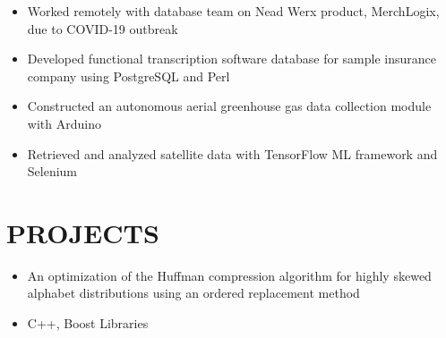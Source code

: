 \documentclass[11pt,letterpaper]{article}
\begin{document}
  {\fontsize{12}{12}}
  
  \begin{itemize}
    \item{Worked remotely with database team on Nead Werx product, MerchLogix, due to COVID-19 outbreak}
    
    \item{Developed functional transcription software database for sample insurance company using PostgreSQL and Perl}
  \end{itemize}

  {\fontsize{12}{12}}

  \begin{itemize}
    \item{Constructed an autonomous aerial greenhouse gas data collection module with Arduino}
    
    \item{Retrieved and analyzed satellite data with TensorFlow ML framework and Selenium}
  \end{itemize}

  \bigskip

  
  \section*{PROJECTS}

  \ifhuffskew
    {\fontsize{12}{12}}

    \begin{itemize}
      \item{An optimization of the Huffman compression algorithm for highly skewed alphabet distributions using an ordered replacement method}
      \item{
        {}
        C++, Boost Libraries
      }
    \end{itemize}
  \fi

  \iffizz
    {\fontsize{12}{12}}
\end{document}
